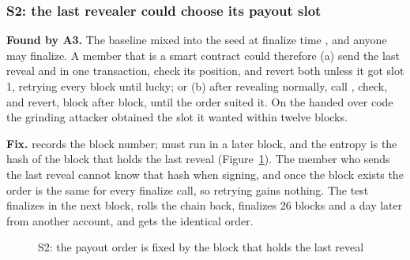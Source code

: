 \subsubsection{S2: the last revealer could choose its payout slot}
\label{sec:s2}
\textbf{Found by A3.} The baseline mixed  into the seed at finalize time
\cite{eip4399}, and anyone may finalize. A member that is a smart contract could therefore (a) send the
last reveal and  in one transaction, check its position, and revert both unless it got
slot 1, retrying every block until lucky; or (b) after revealing normally, call ,
check, and revert, block after block, until the order suited it. On the handed over code the grinding
attacker obtained the slot it wanted within twelve blocks.

\textbf{Fix.}  records the block number;  must run in a later block, and the
entropy is the hash of the block that holds the last reveal (Figure~\ref{fig:s2}). The member who sends
the last reveal cannot know that hash when signing, and once the block exists the order is the same for
every finalize call, so retrying gains nothing. The test finalizes in the next block, rolls the chain
back, finalizes 26 blocks and a day later from another account, and gets the identical order.

\begin{figure}[H]
\centering
{}
\caption{S2: the payout order is fixed by the block that holds the last reveal}
\label{fig:s2}
\end{figure}

